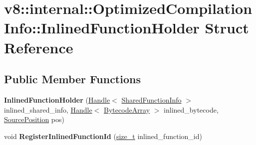 \hypertarget{structv8_1_1internal_1_1OptimizedCompilationInfo_1_1InlinedFunctionHolder}{}\section{v8\+:\+:internal\+:\+:Optimized\+Compilation\+Info\+:\+:Inlined\+Function\+Holder Struct Reference}
\label{structv8_1_1internal_1_1OptimizedCompilationInfo_1_1InlinedFunctionHolder}
\subsection*{Public Member Functions}
\begin{DoxyCompactItemize}
\item 
\mbox{\label{structv8_1_1internal_1_1OptimizedCompilationInfo_1_1InlinedFunctionHolder_a05fa64dc3a811268b2ceed0309d0c315}} 
{\bfseries Inlined\+Function\+Holder} (\mbox{\hyperlink{classv8_1_1internal_1_1Handle}{Handle}}$<$ \mbox{\hyperlink{classv8_1_1internal_1_1SharedFunctionInfo}{Shared\+Function\+Info}} $>$ inlined\+\_\+shared\+\_\+info, \mbox{\hyperlink{classv8_1_1internal_1_1Handle}{Handle}}$<$ \mbox{\hyperlink{classv8_1_1internal_1_1BytecodeArray}{Bytecode\+Array}} $>$ inlined\+\_\+bytecode, \mbox{\hyperlink{classv8_1_1internal_1_1SourcePosition}{Source\+Position}} pos)
\item 
\mbox{\label{structv8_1_1internal_1_1OptimizedCompilationInfo_1_1InlinedFunctionHolder_aafc540f6d18b0e17eb61a540a435c087}} 
void {\bfseries Register\+Inlined\+Function\+Id} (\mbox{\hyperlink{classsize__t}{size\+\_\+t}} inlined\+\_\+function\+\_\+id)
\end{DoxyCompactItemize}
